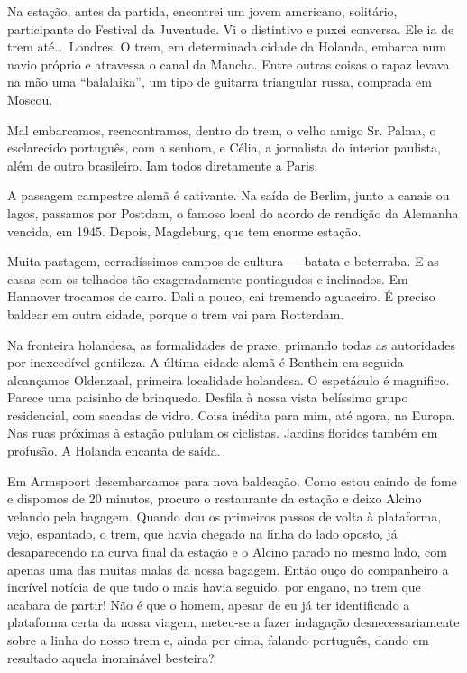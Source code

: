 Na estação, antes da partida, encontrei um jovem americano, solitário, participante do Festival da Juventude. Vi o distintivo e puxei conversa. Ele ia de trem até\ldots\ Londres. O trem, em determinada cidade da Holanda, embarca num navio próprio e atravessa o canal da Mancha. Entre outras coisas o rapaz levava na mão uma ``balalaika'', um tipo de guitarra triangular russa, comprada em Moscou.

Mal embarcamos, reencontramos, dentro do trem, o velho amigo Sr. Palma, o esclarecido português, com a senhora, e Célia, a jornalista do interior paulista, além de outro brasileiro. Iam todos diretamente a Paris.

A passagem campestre alemã é cativante. Na saída de Berlim, junto a canais ou lagos, passamos por Postdam, o famoso local do acordo de rendição da Alemanha vencida, em 1945. Depois, Magdeburg, que tem enorme estação.

Muita pastagem, cerradíssimos campos de cultura --- batata e beterraba. E as casas com os telhados tão exageradamente pontiagudos e inclinados. Em Hannover trocamos de carro. Dali a pouco, cai tremendo aguaceiro. É preciso baldear em outra cidade, porque o trem vai para Rotterdam.

Na fronteira holandesa, as formalidades de praxe, primando todas as autoridades por inexcedível gentileza. A última cidade alemã é Benthein em seguida alcançamos Oldenzaal, primeira localidade holandesa. O espetáculo é magnífico. Parece uma paisinho de brinquedo. Desfila à nossa vista belíssimo grupo residencial, com sacadas de vidro. Coisa inédita para mim, até agora, na Europa. Nas ruas próximas à estação pululam os ciclistas. Jardins floridos também em profusão. A Holanda encanta de saída.

Em Armspoort desembarcamos para nova baldeação. Como estou caindo de fome e dispomos de 20 minutos, procuro o restaurante da estação e deixo Alcino velando pela bagagem. Quando dou os primeiros passos de volta à plataforma, vejo, espantado, o trem, que havia chegado na linha do lado oposto, já desaparecendo na curva final da estação e o Alcino parado no mesmo lado, com apenas uma das muitas malas da nossa bagagem. Então ouço do companheiro a incrível notícia de que tudo o mais havia seguido, por engano, no trem que acabara de partir! Não é que o homem, apesar de eu já ter identificado a plataforma certa da nossa viagem, meteu-se a fazer indagação desnecessariamente sobre a linha do nosso trem e, ainda por cima, falando português, dando em resultado aquela inominável besteira?

